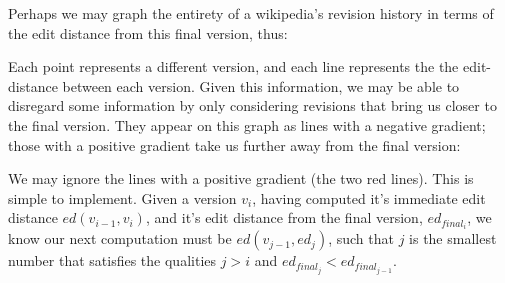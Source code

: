 \documentclass[a4paper,11pt,twoside,notitlepage]{article}
\begin{document}
        Perhaps we may graph the entirety of a wikipedia's revision
        history in terms of the edit distance from this final version,
        thus:

        \begin{figure}[H]
          \centering
          \pgfplotsset{width=0.5\textwidth}
          \label{fig:dummy_history}
        \end{figure}
        
        Each point represents a different version, and each line
        represents the the edit-distance between each version. Given
        this information, we may be able to disregard some information
        by only considering revisions that bring us closer to the
        final version. They appear on this graph as lines with a
        negative gradient; those with a positive gradient take us
        further away from the final version:

        \begin{figure}[H]
          \centering
          \pgfplotsset{width=0.5\textwidth}
          \label{fig:dummy_optimisation_1}
        \end{figure}

        We may ignore the lines with a positive gradient (the two
        red lines). This is simple to implement. Given a version
        $v_i$, having computed it's immediate edit distance
        $ed(v_{i-1},v_i)$, and it's edit distance from the final
        version, $ed_{final_i}$, we know our next computation must be
        $ed(v_{j-1},ed_j)$, such that $j$ is the smallest number that
        satisfies the qualities $j > i$ and $ed_{final_j} <
        ed_{final_{j-1}}$. 
\end{document}
